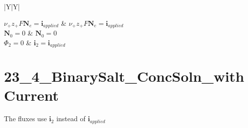 \documentclass[12pt]{article}
\newcommand{\flux}{\mathrm{\mathbf{N}}}
\newcommand{\solcur}{\mathrm{\mathbf{i}}}
\begin{document}
\begin{table}[h]
\begin{tabularx}{\textwidth}{|Y|Y|}
				\hline
				 \\
				\hline

				\(\displaystyle \nu_+ z_+ F \flux_e = \solcur_{applied} \) 	&  \(\displaystyle \nu_+ z_+ F \flux_e = \solcur_{applied} \) \\
				\(\displaystyle \flux_0 = 0 \) 								&  \(\displaystyle \flux_0 = 0 \) \\
				\(\displaystyle \Phi_2 = 0 \)  								&  \(\displaystyle \solcur_2 = \solcur_{applied} \) \\

				\hline

			\end{tabularx}
		\end{table}

	\clearpage
	\section*{23\_4\_BinarySalt\_ConcSoln\_withCurrent}
		The fluxes use $\solcur_2$ instead of $\solcur_{applied}$
\end{document}
